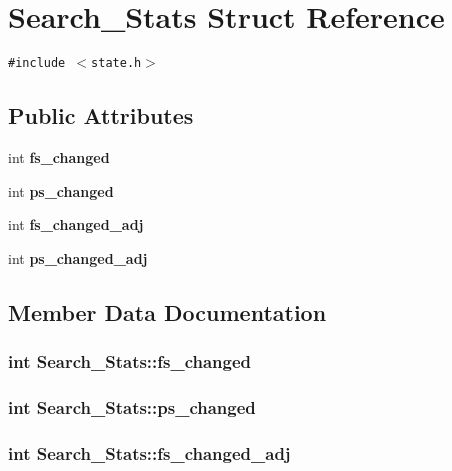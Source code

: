 \section{Search\_\-Stats Struct Reference}
\label{structSearch__Stats}
{\tt \#include $<$state.h$>$}

\subsection*{Public Attributes}
\begin{CompactItemize}
\item 
int {\bf fs\_\-changed}
\item 
int {\bf ps\_\-changed}
\item 
int {\bf fs\_\-changed\_\-adj}
\item 
int {\bf ps\_\-changed\_\-adj}
\end{CompactItemize}


\subsection{Member Data Documentation}
\subsubsection{\setlength{\rightskip}{0pt plus 5cm}int {\bf Search\_\-Stats::fs\_\-changed}}\label{structSearch__Stats_dd8ed88cd0f11097a136879b27d3cbf6}


\subsubsection{\setlength{\rightskip}{0pt plus 5cm}int {\bf Search\_\-Stats::ps\_\-changed}}\label{structSearch__Stats_67e0b661a697dc14562a9ba2b9212687}


\subsubsection{\setlength{\rightskip}{0pt plus 5cm}int {\bf Search\_\-Stats::fs\_\-changed\_\-adj}}\label{structSearch__Stats_980657b01ad056899b16490afdb223a9}


